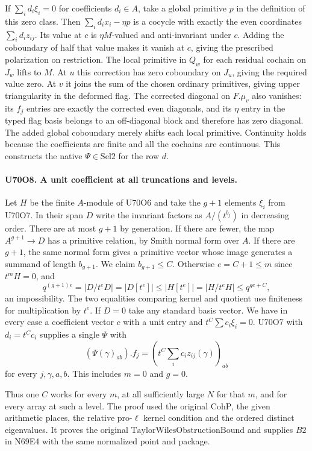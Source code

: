 If $\sum_i d_i\xi_i=0$ for coefficients $d_i\in A$, take a
global primitive $p$ in the definition of this zero class.
Then $\sum_i d_i x_i-\eta p$ is a cocycle with exactly the
even coordinates $\sum_i d_i z_{ij}$. Its value at $c$ is
$\eta M$-valued and anti-invariant under $c$. Adding the
coboundary of half that value makes it vanish at $c$, giving the
prescribed polarization on restriction. The local primitive in
$Q_w$ for each residual cochain on $J_w$ lifts to $M$.
At $u$ this correction has zero coboundary on $J_u$, giving
the required value zero. At $v$ it joins the sum of the chosen
ordinary primitives, giving upper triangularity in the deformed
flag. The corrected diagonal on $F.\mu_v$ also vanishes:
its $f_j$ entries are exactly the corrected even diagonals,
and its $\eta$ entry in the typed flag basis belongs to an
off-diagonal block and therefore has zero diagonal. The added
global coboundary merely shifts each local primitive.
Continuity holds because the coefficients are finite and all the
cochains are continuous. This constructs the native
$\Psi\in\mathrm{Sel2}$ for the row $d$.

\paragraph{U70O8. A unit coefficient at all truncations and levels.}
Let $H$ be the finite $A$-module of U70O6 and take the $g+1$
elements $\xi_i$ from U70O7. In their span $D$ write the
invariant factors as $A/(t^{b_j})$ in decreasing order.
There are at most $g+1$ by generation. If there are fewer,
the map $A^{g+1}\to D$ has a primitive relation, by Smith
normal form over $A$. If there are $g+1$, the same normal form
gives a primitive vector whose image generates a summand of
length $b_{g+1}$. We claim $b_{g+1}\le C$. Otherwise
$e=C+1\le m$ since $t^mH=0$, and
\[
  q^{(g+1)e}=|D/t^eD|=|D[t^e]|\le |H[t^e]|
              =|H/t^eH|\le q^{ge+C},
\]
an impossibility. The two equalities comparing kernel and quotient
use finiteness for multiplication by $t^e$. If $D=0$ take any
standard basis vector. We have in every case a coefficient vector
$c$ with a unit entry and $t^C\sum c_i\xi_i=0$.
U70O7 with $d_i=t^Cc_i$ supplies a single $\Psi$ with
\[
         (\Psi(\gamma)_{ab}).f_j
                 =\left(t^C\sum_i c_i z_{ij}(\gamma)\right)_{ab}
\]
for every $j,\gamma,a,b$. This includes $m=0$ and $g=0$.

Thus one $C$ works for every $m$, at all sufficiently large
$N$ for that $m$, and for every array at such a level. The
proof used the original $\mathrm{CohP}$, the given arithmetic
places, the relative pro-$\ell$ kernel condition and the ordered
distinct eigenvalues. It proves the original
$\mathrm{TaylorWilesObstructionBound}$ and supplies $B2$ in
N69E4 with the same normalized point and package.
